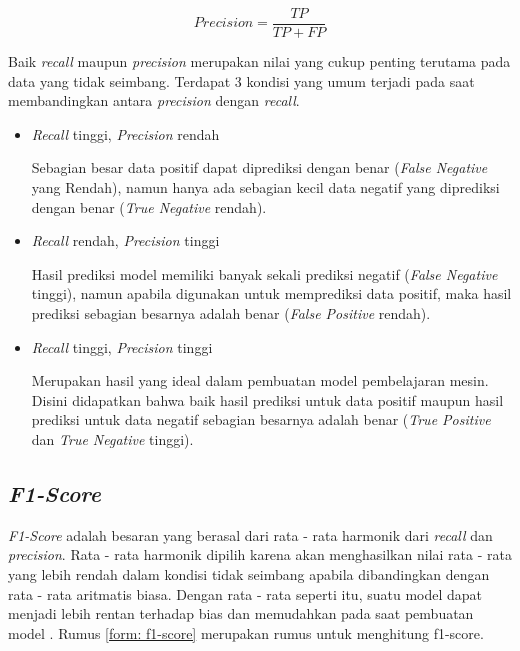 \begin{equation}
    Precision = \frac{TP}{TP+FP}
    \label{form:precision}
\end{equation}

Baik \textit{recall} maupun \textit{precision} merupakan nilai yang cukup penting terutama pada data yang tidak seimbang. Terdapat 3 kondisi yang umum terjadi pada saat membandingkan antara \textit{precision} dengan \textit{recall}.

\begin{itemize}
    \item \textit{Recall} tinggi, \textit{Precision} rendah

          Sebagian besar data positif dapat diprediksi dengan benar (\textit{False Negative} yang Rendah), namun hanya ada sebagian kecil data negatif yang diprediksi dengan benar (\textit{True Negative} rendah).

    \item \textit{Recall} rendah, \textit{Precision} tinggi

          Hasil prediksi model memiliki banyak sekali prediksi negatif (\textit{False Negative} tinggi), namun apabila digunakan untuk memprediksi data positif, maka hasil prediksi sebagian besarnya adalah benar (\textit{False Positive} rendah).

    \item \textit{Recall} tinggi, \textit{Precision} tinggi

          Merupakan hasil yang ideal dalam pembuatan model pembelajaran mesin. Disini didapatkan bahwa baik hasil prediksi untuk data positif maupun hasil prediksi untuk data negatif sebagian besarnya adalah benar (\textit{True Positive} dan \textit{True Negative} tinggi).

\end{itemize}

\subsection{\textit{F1-Score}}

\textit{F1-Score} adalah besaran yang berasal dari rata - rata harmonik dari \textit{recall} dan \textit{precision}. Rata  - rata harmonik dipilih karena akan menghasilkan nilai rata - rata yang lebih rendah dalam kondisi tidak seimbang apabila dibandingkan dengan rata - rata aritmatis biasa. Dengan rata - rata seperti itu, suatu model dapat menjadi lebih rentan terhadap bias dan memudahkan pada saat pembuatan model \cite{metrics_ml}. Rumus \ref{form: f1-score} merupakan rumus untuk menghitung f1-score.

